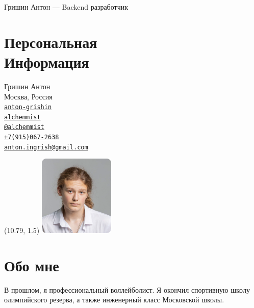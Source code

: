 \documentclass[margin,line]{resume}
\begin{document}
{\sc \large Гришин Антон --- Backend разработчик} \\
\begin{resume}
  \begin{minipage}[t]{0.55\textwidth}
    \section{\mysidestyle Персональная\\Информация}
    Гришин Антон \\
    Москва, Россия \\
    \faLinkedin \space
    \href{https://www.linkedin.com/in/anton-grishin-6966a8362/}{\texttt{anton-grishin}}
    \\
    \faGithub  \space
    \href{https://github.com/alchemmist/}{\texttt{alchemmist}} \\
    \faPaperPlane \space \href{https://t.me/alchemmist}{\texttt{@alchemmist}} \\
    \faPhone \space
    \href{tel:+1234567890}{\color{blue}\texttt{+7(915)067-2638}}  \\
    \faEnvelope \space
    \href{mailto:anton.ingrish@gmail.com}{\color{blue}\texttt{anton.ingrish@gmail.com}}
  \end{minipage}
  \begin{minipage}[H]{0.18\textwidth}
    \begin{textblock}{7}(10.79, 1.5)
      \includegraphics[width=0.27\textwidth]{images/avatar.png}
    \end{textblock}
  \end{minipage}
  \section{\mysidestyle Обо мне}
  В прошлом, я профессиональный воллейболист. Я окончил спортивную
  школу олимпийского резерва, а также инженерный класс Московской школы.


\end{resume}
\end{document}

